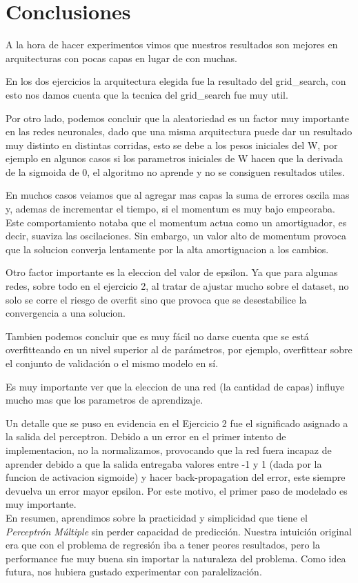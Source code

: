 \section{Conclusiones}
A la hora de hacer experimentos vimos que nuestros resultados son mejores en arquitecturas con pocas capas en lugar de con muchas.

En los dos ejercicios la arquitectura elegida fue la resultado del grid\_search, con esto nos damos cuenta que la tecnica del grid\_search fue muy util.

Por otro lado, podemos concluir que la aleatoriedad es un factor muy importante en las redes neuronales, dado que una misma arquitectura puede dar un resultado muy distinto en distintas corridas, esto se debe a los pesos iniciales del W, por ejemplo en algunos casos si los parametros iniciales de W hacen que la derivada de la sigmoida de 0, el algoritmo no aprende y no se consiguen resultados utiles.

En muchos casos veiamos que al agregar mas capas la suma de errores oscila mas y, ademas de incrementar el tiempo, si el momentum es muy bajo empeoraba. Este comportamiento notaba que el momentum actua como un amortiguador, es decir, suaviza las oscilaciones. Sin embargo, un valor alto de momentum provoca que la solucion converja lentamente por la alta amortiguacion a los cambios.

Otro factor importante es la eleccion del valor de epsilon. Ya que para algunas redes, sobre todo en el ejercicio 2, al tratar de ajustar mucho sobre el dataset, no solo se corre el riesgo de overfit sino que provoca que se desestabilice la convergencia a una solucion.

Tambien podemos concluir que es muy fácil no darse cuenta que se está overfitteando en un nivel superior al de parámetros, por ejemplo, overfittear sobre el conjunto de validación o el mismo modelo en sí.

Es muy importante ver que la eleccion de una red (la cantidad de capas) influye mucho mas que los parametros de aprendizaje.

Un detalle que se puso en evidencia en el Ejercicio 2 fue el significado asignado a la salida del perceptron. Debido a un error en el primer intento de implementacion, no la normalizamos, provocando que la red fuera incapaz de aprender debido a que la salida entregaba valores entre -1 y 1 (dada por la funcion de activacion sigmoide) y hacer back-propagation del error, este siempre devuelva un error mayor epsilon. Por este motivo, el primer paso de modelado es muy importante.
\\

En resumen, aprendimos sobre la practicidad y simplicidad que tiene el \textit{Perceptrón Múltiple} sin perder capacidad de predicción. Nuestra intuición original era que con el problema de regresión iba a tener peores resultados, pero la performance fue muy buena sin importar la naturaleza del problema. Como idea futura, nos hubiera gustado experimentar con paralelización.
